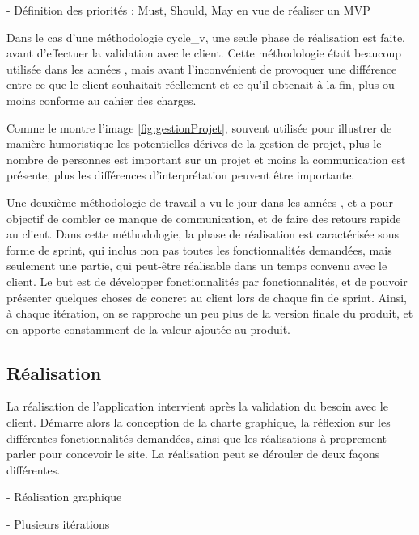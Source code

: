 - Définition des priorités : Must, Should, May en vue de réaliser un MVP

Dans le cas d'une méthodologie \gls{cycle_v}, une seule phase de réalisation est faite, avant d'effectuer la validation avec le client. Cette méthodologie était beaucoup utilisée dans les années , mais avant l'inconvénient de provoquer une différence entre ce que le client souhaitait réellement et ce qu'il obtenait à la fin, plus ou moins conforme au cahier des charges. 


Comme le montre l'image \ref{fig:gestionProjet}, souvent utilisée pour illustrer de manière humoristique les potentielles dérives de la gestion de projet, plus le nombre de personnes est important sur un projet et moins la communication est présente, plus les différences d'interprétation peuvent être importante. 

Une deuxième méthodologie de travail a vu le jour dans les années , et a pour objectif de combler ce manque de communication, et de faire des retours rapide au client. Dans cette méthodologie, la phase de réalisation est caractérisée sous forme de sprint, qui inclus non pas toutes les fonctionnalités demandées, mais seulement une partie, qui peut-être réalisable dans un temps convenu avec le client. Le but est de développer fonctionnalités par fonctionnalités, et de pouvoir présenter quelques choses de concret au client lors de chaque fin de sprint. Ainsi, à chaque itération, on se rapproche un peu plus de la version finale du produit, et on apporte constamment de la valeur ajoutée au produit.


\subsection{Réalisation}

La réalisation de l'application intervient après la validation du besoin avec le client. Démarre alors la conception de la charte graphique, la réflexion sur les différentes fonctionnalités demandées, ainsi que les réalisations à proprement parler pour concevoir le site. La réalisation peut se dérouler de deux façons différentes.

- Réalisation graphique

- Plusieurs itérations

